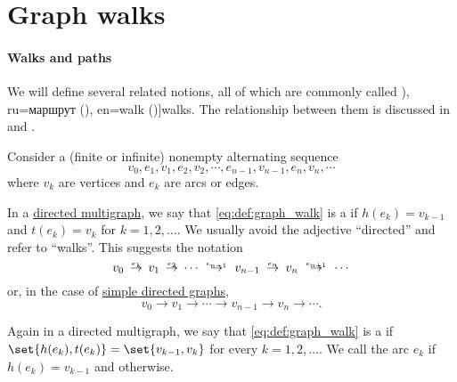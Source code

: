 \section{Graph walks}\label{sec:graph_walks}

\paragraph{Walks and paths}

\begin{definition}\label{def:graph_walk}\mimprovised
  We will define several related notions, all of which are commonly called \term[bg=маршрут (\cite[11]{Мирчев2001Графи}), ru=маршрут (\cite[23]{ЕмеличевИПр1990ТеорияГрафов}), en=walk (\cite[10]{Diestel2017GraphTheory})]{walks}. The relationship between them is discussed in  and .

  Consider a (finite or infinite) nonempty alternating sequence
  \begin{equation}\label{eq:def:graph_walk}
    v_0, e_1, v_1, e_2, v_2, \cdots, e_{n-1}, v_{n-1}, e_n, v_n, \cdots
  \end{equation}
  where \( v_k \) are vertices and \( e_k \) are arcs or edges.

  \begin{thmenum}[series=def:graph_walk]
     In a \hyperref[def:directed_multigraph]{directed multigraph}, we say that \eqref{eq:def:graph_walk} is a  if \( h(e_k) = v_{k-1} \) and \( t(e_k) = v_k \) for \( k = 1, 2, \ldots \). We usually avoid the adjective \enquote{directed} and refer to \enquote{walks}. This suggests the notation
    \begin{equation}\label{eq:def:graph_walk/directed}
      v_0 \reloset {e_1} \to v_1 \reloset {e_2} \to \cdots \reloset {e_{n-1}} \to v_{n-1} \reloset {e_n} \to v_n \reloset {e_{n+1}} \to \cdots
    \end{equation}
    or, in the case of \hyperref[def:directed_graph]{simple directed graphs},
    \begin{equation*}
      v_0 \to v_1 \to \cdots \to v_{n-1} \to v_n \to \cdots.
    \end{equation*}

     Again in a directed multigraph, we say that \eqref{eq:def:graph_walk} is a  if \( \set{ h(e_k), t(e_k) } = \set{ v_{k-1}, v_k } \) for every \( k = 1, 2, \ldots \). We call the arc \( e_k \)  if \( h(e_k) = v_{k-1} \) and  otherwise.


\end{thmenum}
\end{definition}
